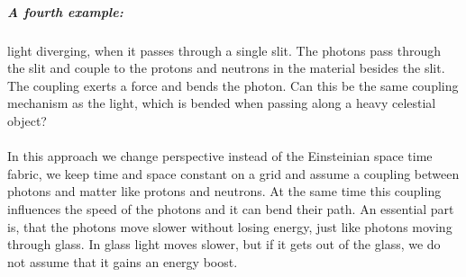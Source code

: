 \subparagraph{A fourth example:}
 light diverging, when it passes through a single slit. The photons pass through the slit and couple to the protons and neutrons in the material besides the slit. The coupling exerts a force and bends the photon. Can this be the same coupling mechanism as the light, which is bended when passing along a heavy celestial object?

\paragraph{}
In this approach we change perspective instead of the Einsteinian space time fabric, we keep time and space constant on a grid and assume a coupling between photons and matter like protons and neutrons. At the same time this coupling influences the speed of the photons and it can bend their path.
An essential part is, that the photons move slower without losing energy, just like photons moving through glass. In glass light moves slower, but if it gets out of the glass, we do not assume that it gains an energy boost.


